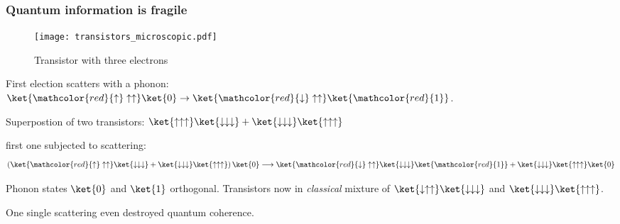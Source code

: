 \begin{frame}
\frametitle{Quantum information is fragile}

\begin{figure}
  \texttt{[image: transistors\_microscopic.pdf]}
  \caption*{Transistor with three electrons}
\end{figure}


First election scatters with a phonon:
$\ket{\mathcolor{red}{\uparrow} \uparrow \uparrow}\ket{0} \rightarrow \ket{\mathcolor{red}{\downarrow} \uparrow \uparrow}\ket{\mathcolor{red}{1}}$.

\pause
Superpostion of two transistors: $\ket{\uparrow \uparrow \uparrow} \ket{\downarrow \downarrow \downarrow} + \ket{\downarrow \downarrow \downarrow} \ket{\uparrow \uparrow \uparrow }$

first one subjected to scattering:
$$
\left( \ket{\mathcolor{red}{\uparrow} \uparrow \uparrow} \ket{\downarrow \downarrow \downarrow}
+ \ket{\downarrow \downarrow \downarrow} \ket{\uparrow \uparrow \uparrow} \right) \ket{0}
\longrightarrow
\ket{\mathcolor{red}{\downarrow} \uparrow \uparrow} \ket{\downarrow \downarrow \downarrow} \ket{\mathcolor{red}{1}}
+ \ket{\downarrow \downarrow \downarrow} \ket{\uparrow \uparrow \uparrow} \ket{0}
$$

\pause
Phonon states $\ket{0}$ and $\ket{1}$ orthogonal. Transistors now in \emph{classical} mixture of $\ket{\downarrow \uparrow \uparrow} \ket{\downarrow \downarrow \downarrow}$ and $\ket{\downarrow \downarrow \downarrow} \ket{\uparrow \uparrow \uparrow}$.
\pause

One single scattering even destroyed quantum coherence.
\end{frame}
